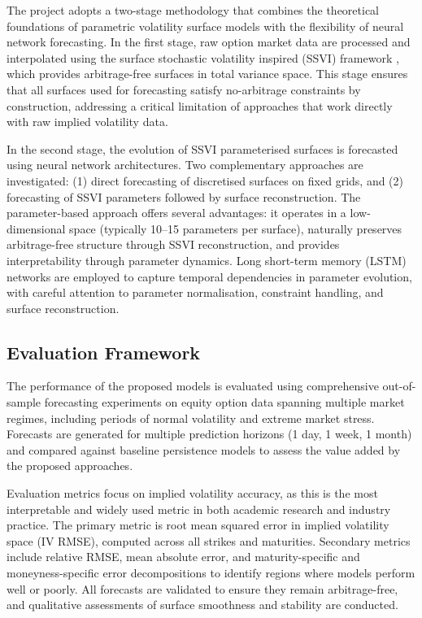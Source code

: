 The project adopts a two-stage methodology that combines the theoretical foundations of parametric volatility surface models with the flexibility of neural network forecasting. In the first stage, raw option market data are processed and interpolated using the surface stochastic volatility inspired (SSVI) framework \cite{GatJac:14}, which provides arbitrage-free surfaces in total variance space. This stage ensures that all surfaces used for forecasting satisfy no-arbitrage constraints by construction, addressing a critical limitation of approaches that work directly with raw implied volatility data.

In the second stage, the evolution of SSVI parameterised surfaces is forecasted using neural network architectures. Two complementary approaches are investigated: (1) direct forecasting of discretised surfaces on fixed grids, and (2) forecasting of SSVI parameters followed by surface reconstruction. The parameter-based approach offers several advantages: it operates in a low-dimensional space (typically 10--15 parameters per surface), naturally preserves arbitrage-free structure through SSVI reconstruction, and provides interpretability through parameter dynamics. Long short-term memory (LSTM) networks are employed to capture temporal dependencies in parameter evolution, with careful attention to parameter normalisation, constraint handling, and surface reconstruction.

\subsection{Evaluation Framework}

The performance of the proposed models is evaluated using comprehensive out-of-sample forecasting experiments on equity option data spanning multiple market regimes, including periods of normal volatility and extreme market stress. Forecasts are generated for multiple prediction horizons (1 day, 1 week, 1 month) and compared against baseline persistence models to assess the value added by the proposed approaches.

Evaluation metrics focus on implied volatility accuracy, as this is the most interpretable and widely used metric in both academic research and industry practice. The primary metric is root mean squared error in implied volatility space (IV RMSE), computed across all strikes and maturities. Secondary metrics include relative RMSE, mean absolute error, and maturity-specific and moneyness-specific error decompositions to identify regions where models perform well or poorly. All forecasts are validated to ensure they remain arbitrage-free, and qualitative assessments of surface smoothness and stability are conducted.

